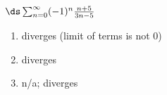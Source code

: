 {$\ds \sum_{n=0}^\infty (-1)^{n}\frac{n+5}{3n-5}$
}
{\begin{enumerate}
	\item diverges (limit of terms is not 0)
	\item	diverges
	\item n/a; diverges
\end{enumerate}
}